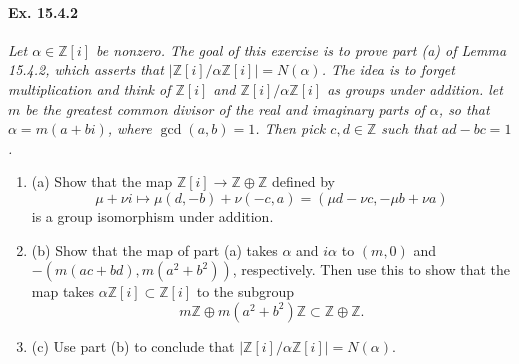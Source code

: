 \documentclass[11pt,a4paper]{article}
\newcommand{\be} {\begin{enumerate}}
\newcommand{\ee} {\end{enumerate}}
\newcommand{\Z}{\mathbb{Z}}
\begin{document}
\paragraph{Ex. 15.4.2}{\it Let $\alpha \in \Z[i]$ be nonzero. The goal of this exercise is to prove part (a) of Lemma 15.4.2, which asserts that $|\Z[i]/\alpha \Z[i]| = N(\alpha)$. The idea is to forget multiplication and think of $\Z[i]$ and $\Z[i]/\alpha \Z[i]$ as groups under addition. let $m$ be the greatest common divisor of the real and imaginary parts of $\alpha$, so that $\alpha = m(a+bi)$, where $\gcd(a,b) = 1$. Then pick $c,d \in \Z$ such that $ad-bc = 1$.
\be
\item[(a)] Show that the map $\Z[i] \to \Z \oplus \Z$ defined by
$$\mu + \nu i \mapsto \mu(d,-b) + \nu (-c,a) = (\mu d - \nu c, - \mu b + \nu a)$$
is a group isomorphism under addition.
\item[(b)] Show that the map of part (a) takes $\alpha$ and $i\alpha$ to $(m,0)$ and $-(m(ac+bd), m(a^2+b^2))$, respectively. Then use this to show that the map takes $\alpha \Z[i] \subset \Z[i]$ to the subgroup
$$m\Z \oplus m(a^2+b^2)\Z \subset \Z \oplus \Z.$$
\item[(c)] Use part (b) to conclude that $|\Z[i]/\alpha \Z[i]| = N(\alpha)$.
\ee

}
\end{document}
